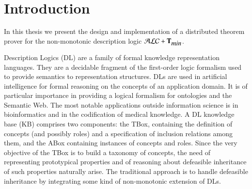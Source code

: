 \documentclass[a4paper, 11pt, oneside]{elsarticle}
\newcommand{\tip}{{\bf T}}
\newcommand{\alctmin}{\mathcal{ALC}+\tip_{\mbox{\em min}}}
\begin{document}
\newpage


\tableofcontents

\newpage


\section{Introduction}

In this thesis we present the design and implementation of a distributed theorem prover for the non-monotonic description logic $\alctmin$.

Description Logics (DL) are a family of formal knowledge representation languages. They are a decidable fragment of the first-order logic formalism used to provide semantics to representation structures.
DLs are used in artificial intelligence for formal reasoning on the concepts of an application domain. It is of particular importance in providing a logical formalism for ontologies and the Semantic Web. The most notable applications outside information science is in bioinformatics and in the codification of medical knowledge. A DL knowledge base (KB) comprises two components: the TBox, containing the definition of concepts (and possibly roles) and a specification of inclusion relations among them, and the ABox containing instances of concepts and roles. Since the very objective of the TBox is to build a taxonomy of concepts, the need of representing prototypical properties and of reasoning about defeasible inheritance of such properties naturally arise. The traditional approach is to handle defeasible inheritance by integrating some kind of non-monotonic extension of DLs.


\end{document}
